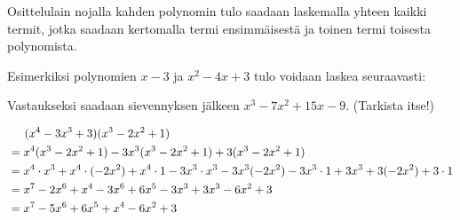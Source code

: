Osittelulain nojalla kahden polynomin tulo saadaan laskemalla yhteen kaikki
termit, jotka saadaan kertomalla termi ensimmäisestä ja toinen termi toisesta
polynomista.

\newcommand{\pbezier}[4]{
	\pgfmathsetmacro{\PBxa}{#1}
	\pgfmathsetmacro{\PBxb}{#2}
	\pgfmathsetmacro{\PBya}{#3}
	\pgfmathsetmacro{\PByb}{#3+#4}
	\pgfmathsetmacro{\PBca}{0.8 * \PBxa + 0.2 * \PBxb}
	\pgfmathsetmacro{\PBcb}{0.2 * \PBxa + 0.8 * \PBxb}
	\draw[color=red] (\PBxa, \PBya) .. controls (\PBca, \PByb) and (\PBcb, \PByb) .. (\PBxb, \PBya);
}


Esimerkiksi polynomien $x-3$ ja $x^2-4x+3$ tulo voidaan laskea seuraavasti:
\newline
Vastaukseksi saadaan sievennyksen jälkeen $x^3-7x^2+15x-9$. (Tarkista itse!)

\begin{esimerkki}
\begin{align*}
&\hspace{0.5cm}(x^4-3x^3+3)(x^3-2x^2+1) \\
&= x^4 (x^3-2x^2+1) - 3x^3 (x^3-2x^2+1) + 3 (x^3-2x^2+1) \\
&= x^4\cdot x^3 + x^4\cdot (-2x^2)+x^4\cdot 1-3x^3\cdot x^3-3x^3(-2x^2)-3x^3\cdot1+3x^3+3(-2x^2)+3\cdot 1 \\
&= x^7-2x^6+x^4-3x^6+6x^5-3x^3+3x^3-6x^2+3 \\
&= x^7-5x^6+6x^5+x^4-6x^2+3
\end{align*}
\end{esimerkki}

